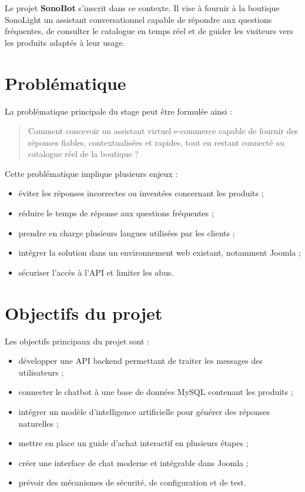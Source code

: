 \documentclass[12pt,a4paper]{report}
\begin{document}
Le projet \textbf{SonoBot} s'inscrit dans ce contexte. Il vise à fournir à la boutique SonoLight un assistant conversationnel capable de répondre aux questions fréquentes, de consulter le catalogue en temps réel et de guider les visiteurs vers les produits adaptés à leur usage.

\section{Problématique}

La problématique principale du stage peut être formulée ainsi :

\begin{quote}
Comment concevoir un assistant virtuel e-commerce capable de fournir des réponses fiables, contextualisées et rapides, tout en restant connecté au catalogue réel de la boutique ?
\end{quote}

Cette problématique implique plusieurs enjeux :

\begin{itemize}
    \item éviter les réponses incorrectes ou inventées concernant les produits ;
    \item réduire le temps de réponse aux questions fréquentes ;
    \item prendre en charge plusieurs langues utilisées par les clients ;
    \item intégrer la solution dans un environnement web existant, notamment Joomla ;
    \item sécuriser l'accès à l'API et limiter les abus.
\end{itemize}

\section{Objectifs du projet}

Les objectifs principaux du projet sont :

\begin{itemize}
    \item développer une API backend permettant de traiter les messages des utilisateurs ;
    \item connecter le chatbot à une base de données MySQL contenant les produits ;
    \item intégrer un modèle d'intelligence artificielle pour générer des réponses naturelles ;
    \item mettre en place un guide d'achat interactif en plusieurs étapes ;
    \item créer une interface de chat moderne et intégrable dans Joomla ;
    \item prévoir des mécanismes de sécurité, de configuration et de test.
\end{itemize}
\end{document}
